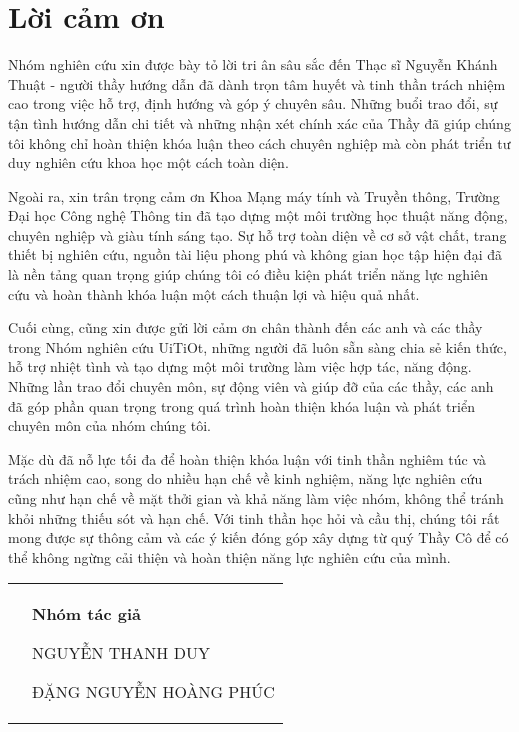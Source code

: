 \chapter*{Lời cảm ơn}
Nhóm nghiên cứu xin được bày tỏ lời tri ân sâu sắc đến Thạc sĩ Nguyễn Khánh Thuật - người thầy hướng dẫn đã dành trọn tâm huyết và tinh thần trách nhiệm cao trong việc hỗ trợ, định hướng và góp ý chuyên sâu. Những buổi trao đổi, sự tận tình hướng dẫn chi tiết và những nhận xét chính xác của Thầy đã giúp chúng tôi không chỉ hoàn thiện khóa luận theo cách chuyên nghiệp mà còn phát triển tư duy nghiên cứu khoa học một cách toàn diện.

Ngoài ra, xin trân trọng cảm ơn Khoa Mạng máy tính và Truyền thông, Trường Đại học Công nghệ Thông tin đã tạo dựng một môi trường học thuật năng động, chuyên nghiệp và giàu tính sáng tạo. Sự hỗ trợ toàn diện về cơ sở vật chất, trang thiết bị nghiên cứu, nguồn tài liệu phong phú và không gian học tập hiện đại đã là nền tảng quan trọng giúp chúng tôi có điều kiện phát triển năng lực nghiên cứu và hoàn thành khóa luận một cách thuận lợi và hiệu quả nhất.

Cuối cùng, cũng xin được gửi lời cảm ơn chân thành đến các anh và các thầy trong Nhóm nghiên cứu UiTiOt, những người đã luôn sẵn sàng chia sẻ kiến thức, hỗ trợ nhiệt tình và tạo dựng một môi trường làm việc hợp tác, năng động. Những lần trao đổi chuyên môn, sự động viên và giúp đỡ của các thầy, các anh đã góp phần quan trọng trong quá trình hoàn thiện khóa luận và phát triển chuyên môn của nhóm chúng tôi.

Mặc dù đã nỗ lực tối đa để hoàn thiện khóa luận với tinh thần nghiêm túc và trách nhiệm cao, song do nhiều hạn chế về kinh nghiệm, năng lực nghiên cứu cũng như hạn chế về mặt thởi gian và khả năng làm việc nhóm, không thể tránh khỏi những thiếu sót và hạn chế. Với tinh thần học hỏi và cầu thị, chúng tôi rất mong được sự thông cảm và các ý kiến đóng góp xây dựng từ quý Thầy Cô để có thể không ngừng cải thiện và hoàn thiện năng lực nghiên cứu của mình.
{
\begin{table}[ht]
\centering
\begin{tabular}{>{\centering}m{}>{\centering\arraybackslash}m{}}
 & \textbf{Nhóm tác giả}
 
 NGUYỄN THANH DUY
 
 ĐẶNG NGUYỄN HOÀNG PHÚC
\end{tabular}
\end{table}
}